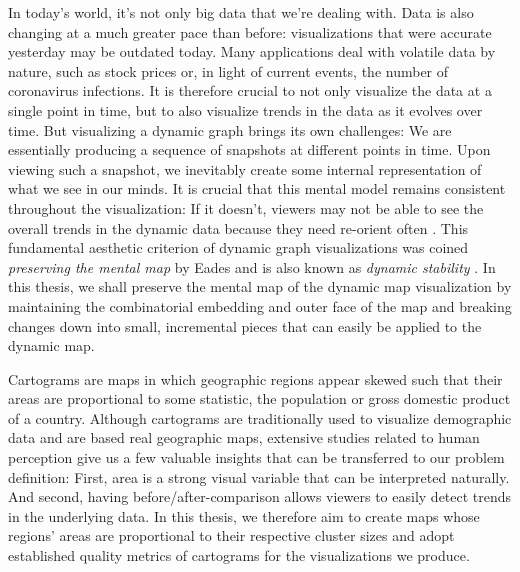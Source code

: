 In today's world, it's not only big data that we're dealing with. Data is also changing at a much greater pace than before: visualizations that were accurate yesterday may be outdated today. Many applications deal with volatile data by nature, such as stock prices or, in light of current events, the number of coronavirus infections. It is therefore crucial to not only visualize the data at a single point in time, but to also visualize trends in the data as it evolves over time. But visualizing a dynamic graph brings its own challenges: We are essentially producing a sequence of snapshots at different points in time. Upon viewing such a snapshot, we inevitably create some internal representation of what we see in our minds. It is crucial that this mental model remains consistent throughout the visualization: If it doesn't, viewers may not be able to see the overall trends in the dynamic data because they need re-orient often \cite{bohringer1990using} \cite{lee2006mental} \cite{purchase2006important}. This fundamental aesthetic criterion of dynamic graph visualizations was coined \emph{preserving the mental map} by Eades \etal{} \cite{eades1991preserving} \cite{misue1995layout} and is also known as \emph{dynamic stability} \cite{diehl2002graphs}.
In this thesis, we shall preserve the mental map of the dynamic map visualization by maintaining the combinatorial embedding and outer face of the map and breaking changes down into small, incremental pieces that can easily be applied to the dynamic map.

Cartograms are maps in which geographic regions appear skewed such that their areas are proportional to some statistic, \eg{} the population or gross domestic product of a country. Although cartograms are traditionally used to visualize demographic data and are based real geographic maps, extensive studies related to human perception \cite{nusrat2016state} \cite{nusrat2018evaluating} give us a few valuable insights that can be transferred to our problem definition: First, area is a strong visual variable that can be interpreted naturally. And second, having before/after-comparison allows viewers to easily detect trends in the underlying data.
In this thesis, we therefore aim to create maps whose regions' areas are proportional to their respective cluster sizes and adopt established quality metrics of cartograms for the visualizations we produce.

